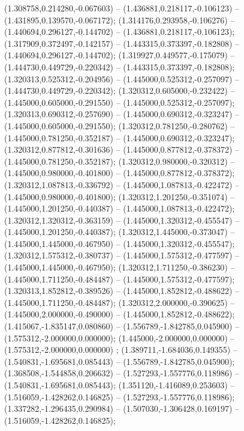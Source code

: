 (1.308758,0.214280,-0.067603) -- (1.436881,0.218117,-0.106123) -- (1.431895,0.139570,-0.067172);
 (1.314176,0.293958,-0.106276) -- (1.440694,0.296127,-0.144702) -- (1.436881,0.218117,-0.106123);
 (1.317909,0.372497,-0.142157) -- (1.443315,0.373397,-0.182808) -- (1.440694,0.296127,-0.144702);
 (1.319927,0.449577,-0.175079) -- (1.444730,0.449729,-0.220342) -- (1.443315,0.373397,-0.182808);
 (1.320313,0.525312,-0.204956) -- (1.445000,0.525312,-0.257097) -- (1.444730,0.449729,-0.220342);
 (1.320312,0.605000,-0.232422) -- (1.445000,0.605000,-0.291550) -- (1.445000,0.525312,-0.257097);
 (1.320313,0.690312,-0.257690) -- (1.445000,0.690312,-0.323247) -- (1.445000,0.605000,-0.291550);
 (1.320312,0.781250,-0.280762) -- (1.445000,0.781250,-0.352187) -- (1.445000,0.690312,-0.323247);
 (1.320312,0.877812,-0.301636) -- (1.445000,0.877812,-0.378372) -- (1.445000,0.781250,-0.352187);
 (1.320312,0.980000,-0.320312) -- (1.445000,0.980000,-0.401800) -- (1.445000,0.877812,-0.378372);
 (1.320312,1.087813,-0.336792) -- (1.445000,1.087813,-0.422472) -- (1.445000,0.980000,-0.401800);
 (1.320312,1.201250,-0.351074) -- (1.445000,1.201250,-0.440387) -- (1.445000,1.087813,-0.422472);
 (1.320312,1.320312,-0.363159) -- (1.445000,1.320312,-0.455547) -- (1.445000,1.201250,-0.440387);
 (1.320312,1.445000,-0.373047) -- (1.445000,1.445000,-0.467950) -- (1.445000,1.320312,-0.455547);
 (1.320312,1.575312,-0.380737) -- (1.445000,1.575312,-0.477597) -- (1.445000,1.445000,-0.467950);
 (1.320312,1.711250,-0.386230) -- (1.445000,1.711250,-0.484487) -- (1.445000,1.575312,-0.477597);
 (1.320313,1.852812,-0.389526) -- (1.445000,1.852812,-0.488622) -- (1.445000,1.711250,-0.484487);
 (1.320312,2.000000,-0.390625) -- (1.445000,2.000000,-0.490000) -- (1.445000,1.852812,-0.488622);
 (1.415067,-1.835147,0.080860) -- (1.556789,-1.842785,0.045900) -- (1.575312,-2.000000,0.000000);
 (1.445000,-2.000000,0.000000) -- (1.575312,-2.000000,0.000000) ;
 (1.389711,-1.684036,0.149355) -- (1.540831,-1.695681,0.085443) -- (1.556789,-1.842785,0.045900);
 (1.368508,-1.544858,0.206632) -- (1.527293,-1.557776,0.118986) -- (1.540831,-1.695681,0.085443);
 (1.351120,-1.416089,0.253603) -- (1.516059,-1.428262,0.146825) -- (1.527293,-1.557776,0.118986);
 (1.337282,-1.296435,0.290984) -- (1.507030,-1.306428,0.169197) -- (1.516059,-1.428262,0.146825);
